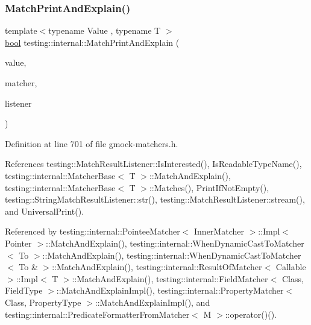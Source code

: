 \subsubsection{\texorpdfstring{Match\+Print\+And\+Explain()}{MatchPrintAndExplain()}}
{\footnotesize\ttfamily template$<$typename Value , typename T $>$ \\
\hyperlink{classbool}{bool} testing\+::internal\+::\+Match\+Print\+And\+Explain (\begin{DoxyParamCaption}\item[{\hyperlink{namespacetesting_ae44c50a3a7f0a46f05c8a0b0592b4a62}{Value} \&}]{value,  }\item[{const \hyperlink{classtesting_1_1Matcher}{Matcher}$<$ T $>$ \&}]{matcher,  }\item[{\hyperlink{classtesting_1_1MatchResultListener}{Match\+Result\+Listener} $\ast$}]{listener }\end{DoxyParamCaption})}



Definition at line 701 of file gmock-\/matchers.\+h.



References testing\+::\+Match\+Result\+Listener\+::\+Is\+Interested(), Is\+Readable\+Type\+Name(), testing\+::internal\+::\+Matcher\+Base$<$ T $>$\+::\+Match\+And\+Explain(), testing\+::internal\+::\+Matcher\+Base$<$ T $>$\+::\+Matches(), Print\+If\+Not\+Empty(), testing\+::\+String\+Match\+Result\+Listener\+::str(), testing\+::\+Match\+Result\+Listener\+::stream(), and Universal\+Print().



Referenced by testing\+::internal\+::\+Pointee\+Matcher$<$ Inner\+Matcher $>$\+::\+Impl$<$ Pointer $>$\+::\+Match\+And\+Explain(), testing\+::internal\+::\+When\+Dynamic\+Cast\+To\+Matcher$<$ To $>$\+::\+Match\+And\+Explain(), testing\+::internal\+::\+When\+Dynamic\+Cast\+To\+Matcher$<$ To \& $>$\+::\+Match\+And\+Explain(), testing\+::internal\+::\+Result\+Of\+Matcher$<$ Callable $>$\+::\+Impl$<$ T $>$\+::\+Match\+And\+Explain(), testing\+::internal\+::\+Field\+Matcher$<$ Class, Field\+Type $>$\+::\+Match\+And\+Explain\+Impl(), testing\+::internal\+::\+Property\+Matcher$<$ Class, Property\+Type $>$\+::\+Match\+And\+Explain\+Impl(), and testing\+::internal\+::\+Predicate\+Formatter\+From\+Matcher$<$ M $>$\+::operator()().


